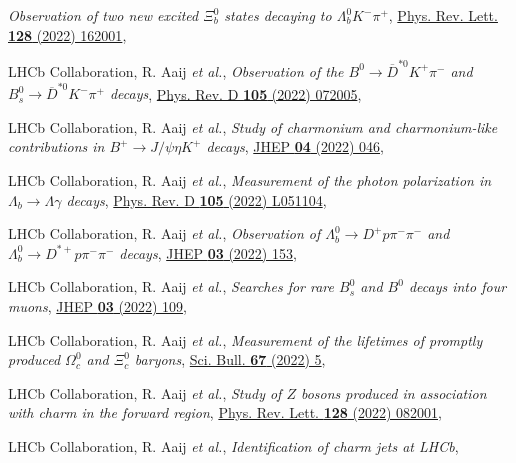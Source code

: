 \begin{cvcontent}
\begin{enumerate}[label={[\arabic*]}, leftmargin=1.5cm]
    \emph{Observation of two new excited $\Xi_b^0$ states decaying to  $\Lambda_b^0 K^- \pi^+$},
    \href{https://link.aps.org/doi/10.1103/PhysRevLett.128.162001}{Phys. Rev. Lett. \textbf{128} (2022) 162001},
    \item LHCb Collaboration, R. Aaij \emph{et al.}, 
    \emph{Observation of the $B^0\rightarrow\overline{D}^{*0}K^{+}\pi^{-}$ and $B_s^0\rightarrow\overline{D}^{*0}K^{-}\pi^{+}$ decays},
    \href{https://link.aps.org/doi/10.1103/PhysRevD.105.072005}{Phys. Rev. D \textbf{105} (2022) 072005},
    \item LHCb Collaboration, R. Aaij \emph{et al.},
    \emph{Study of charmonium and charmonium-like contributions in $B^+ \rightarrow J/\psi \eta K^+$ decays},
    \href{https://doi.org/10.1007/JHEP04(2022)046}{JHEP \textbf{04} (2022) 046},
    \item LHCb Collaboration, R. Aaij \emph{et al.}, 
    \emph{Measurement of the photon polarization in $\Lambda_b \to \Lambda \gamma$ decays},
    \href{https://link.aps.org/doi/10.1103/PhysRevD.105.L051104}{Phys. Rev. D \textbf{105} (2022) L051104},
    \item LHCb Collaboration, R. Aaij \emph{et al.}, 
    \emph{Observation of $\Lambda_b^0\rightarrow D^+ p \pi^-\pi^-$ and $\Lambda_b^0\rightarrow D^{*+} p \pi^-\pi^-$ decays},
    \href{https://doi.org/10.1007/JHEP03(2022)153}{JHEP \textbf{03} (2022) 153},
    \item LHCb Collaboration, R. Aaij \emph{et al.}, 
    \emph{Searches for rare $B_s^0$ and $B^0$ decays into four muons},
    \href{https://doi.org/10.1007/JHEP03(2022)109}{JHEP \textbf{03} (2022) 109},
    \item LHCb Collaboration, R. Aaij \emph{et al.}, 
    \emph{Measurement of the lifetimes of promptly produced $\Omega^{0}_{c}$ and $\Xi^{0}_{c}$ baryons},
    \href{https://doi.org/10.1016/j.scib.2021.11.022}{Sci. Bull. \textbf{67} (2022) 5},
    \item LHCb Collaboration, R. Aaij \emph{et al.}, 
    \emph{Study of $Z$ bosons produced in association with charm in the forward region},
    \href{https://journals.aps.org/prl/abstract/10.1103/PhysRevLett.128.082001}{Phys. Rev. Lett. \textbf{128} (2022) 082001},
    \item LHCb Collaboration, R. Aaij \emph{et al.}, 
    \emph{Identification of charm jets at LHCb},

\end{enumerate}
\end{cvcontent}
